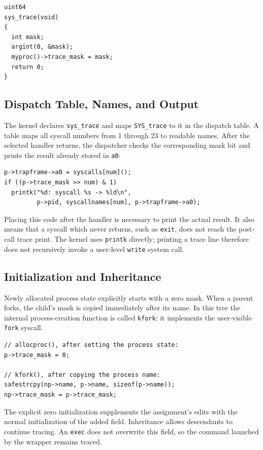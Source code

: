 \documentclass[12pt,a4paper]{article}
\begin{document}
\begin{lstlisting}[caption={Handler added to kernel/sysproc.c}]
uint64
sys_trace(void)
{
  int mask;
  argint(0, &mask);
  myproc()->trace_mask = mask;
  return 0;
}
\end{lstlisting}

\subsection{Dispatch Table, Names, and Output}
The kernel declares \texttt{sys\_trace} and maps \texttt{SYS\_trace} to it in the
dispatch table. A table maps all syscall numbers from 1 through 23 to readable
names. After the selected handler returns, the dispatcher checks the corresponding
mask bit and prints the result already stored in \texttt{a0}:

\begin{lstlisting}[caption={Trace logic placed after syscall execution}]
p->trapframe->a0 = syscalls[num]();
if ((p->trace_mask >> num) & 1)
  printk("%d: syscall %s -> %ld\n",
         p->pid, syscallnames[num], p->trapframe->a0);
\end{lstlisting}

Placing this code after the handler is necessary to print the actual result.
It also means that a syscall which never returns, such as \texttt{exit}, does
not reach the post-call trace print. The kernel uses \texttt{printk} directly;
printing a trace line therefore does not recursively invoke a user-level
\texttt{write} system call.

\subsection{Initialization and Inheritance}
Newly allocated process state explicitly starts with a zero mask. When a parent
forks, the child's mask is copied immediately after its name. In this tree the
internal process-creation function is called \texttt{kfork}; it implements the
user-visible \texttt{fork} syscall.

\begin{lstlisting}[caption={Initialization and inheritance of the trace mask}]
// allocproc(), after setting the process state:
p->trace_mask = 0;

// kfork(), after copying the process name:
safestrcpy(np->name, p->name, sizeof(p->name));
np->trace_mask = p->trace_mask;
\end{lstlisting}

The explicit zero initialization supplements the assignment's edits with the
normal initialization of the added field. Inheritance allows descendants to
continue tracing. An \texttt{exec} does not overwrite this field, so the command
launched by the wrapper remains traced.
\end{document}
